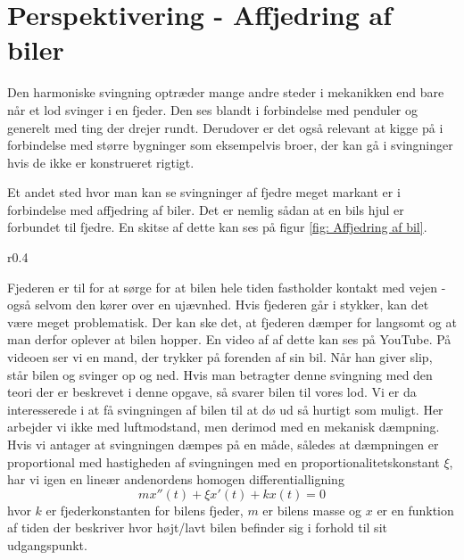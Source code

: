 \chapter{Perspektivering - Affjedring af biler}
Den harmoniske svingning optræder mange andre steder i mekanikken end bare når et lod svinger i en fjeder.
Den ses blandt i forbindelse med penduler og generelt med ting der drejer rundt.
Derudover er det også relevant at kigge på i forbindelse med større bygninger som eksempelvis broer, der kan gå i svingninger hvis de ikke er konstrueret rigtigt. 

Et andet sted hvor man kan se svingninger af fjedre meget markant er i forbindelse med affjedring af biler. 
Det er nemlig sådan at en bils hjul er forbundet til fjedre. 
En skitse af dette kan ses på figur \ref{fig: Affjedring af bil}.

\begin{wrapfigure}{r}{0.4\textwidth}
\center
{}
\caption{Skitsetegning af fjeder (blå) fastsat til bils hjul.}
\label{fig: Affjedring af bil}
\end{wrapfigure}

Fjederen er til for at sørge for at bilen hele tiden fastholder kontakt med vejen - også selvom den kører over en ujævnhed. 
Hvis fjederen går i stykker, kan det være meget problematisk. 
Der kan ske det, at fjederen dæmper for langsomt og at man derfor oplever at bilen hopper.
En video af af dette kan ses på YouTube.
På videoen ser vi en mand, der trykker på forenden af sin bil. 
Når han giver slip, står bilen og svinger op og ned. 
Hvis man betragter denne svingning med den teori der er beskrevet i denne opgave, så svarer bilen til vores lod.
Vi er da interesserede i at få svingningen af bilen til at dø ud så hurtigt som muligt. 
Her arbejder vi ikke med luftmodstand, men derimod med en mekanisk dæmpning. 
Hvis vi antager at svingningen dæmpes på en måde, således at dæmpningen er proportional med hastigheden af svingningen med en proportionalitetskonstant $\xi$, har vi igen en lineær andenordens homogen differentialligning
$$mx''(t)+\xi x'(t) + k x(t) = 0$$
hvor $k$ er fjederkonstanten for bilens fjeder, $m$ er bilens masse og $x$ er en funktion af tiden der beskriver hvor højt/lavt bilen befinder sig i forhold til sit udgangspunkt.

